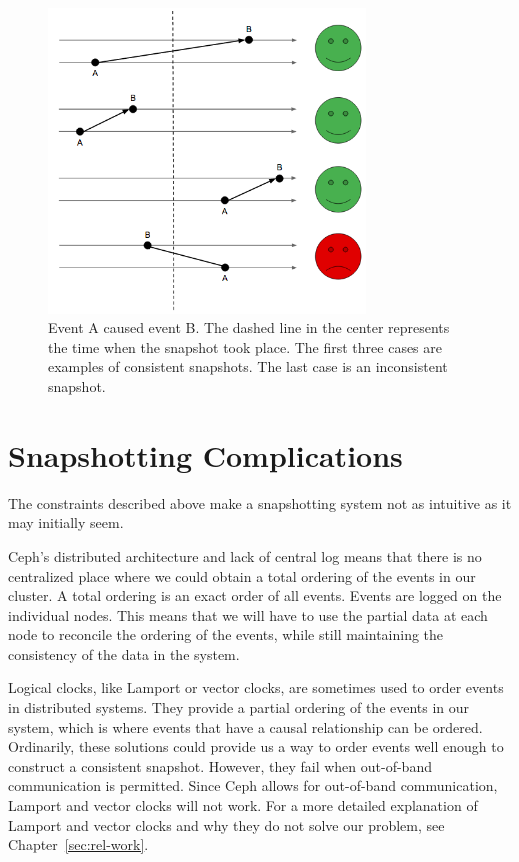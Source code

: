 \begin{figure}[h]
  \centering
  \caption{Event A caused event B. The dashed line in the center represents the time when the snapshot took place. The first three cases are examples of consistent snapshots. The last case is an inconsistent snapshot.} 
  \label{fig:consistency}
  \includegraphics[width=0.75\textwidth]{consistency.png}
\end{figure}

\section{Snapshotting Complications}

The constraints described above make a snapshotting system not as intuitive as
it may initially seem.

Ceph's distributed architecture and lack of central log means that there is no
centralized place where we could obtain a total ordering of the events in our
cluster. A total ordering is an exact order of all events. Events
are logged on the individual nodes. This means that we will have to
use the partial data at each node to reconcile the ordering of the events, 
while still maintaining the consistency of the data in the system.

Logical clocks, like Lamport or vector clocks, are sometimes used to order 
events in distributed systems. They provide a partial ordering of the events in our system, which is
where events that have a causal relationship can be ordered. Ordinarily, these solutions could provide us a way to order events well enough to construct a consistent snapshot. However, they fail when
out-of-band communication is permitted. Since Ceph allows for out-of-band 
communication, Lamport and vector clocks will not work. For a more detailed explanation
of Lamport and vector clocks and why they do not solve our problem, see 
Chapter~\ref{sec:rel-work}.

